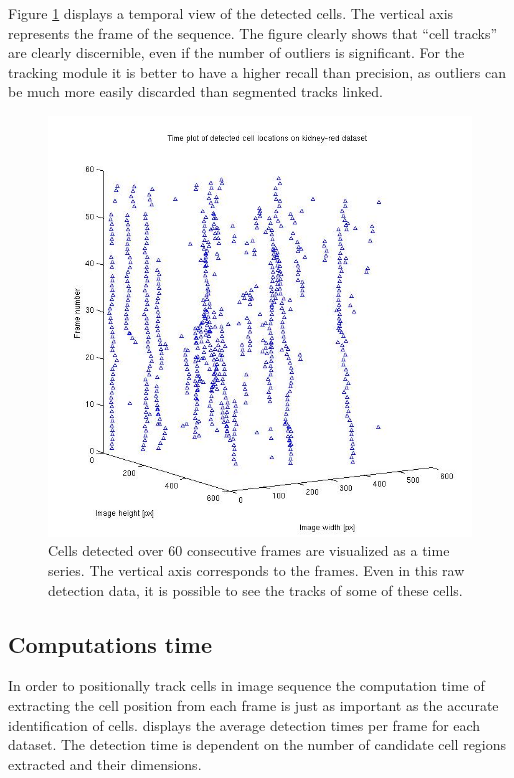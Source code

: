 		
		Figure \ref{fig:results_cell_tracks_detection} displays a temporal view of the detected cells. The vertical axis represents the frame of the sequence. The figure clearly shows that ``cell tracks'' are clearly discernible, even if the number of outliers is significant. For the tracking module it is better to have a higher recall than precision, as outliers can be much more easily discarded than segmented tracks linked.
		\begin{figure}
			\includegraphics[width=\textwidth]{images/cell_tracks}
				\caption{Cells detected over 60 consecutive frames are visualized as a time series. The vertical axis corresponds to the frames. Even in this raw detection data, it is possible to see the tracks of some of these cells.}
			\label{fig:results_cell_tracks_detection}
		\end{figure}
			
				
		
	\subsection{Computations time \statusnew}
	
		In order to positionally track cells in image sequence the computation time of extracting the cell position from each frame is just as important as the accurate identification of cells.  displays the average detection times per frame for each dataset. The detection time is dependent on the number of candidate cell regions extracted and their dimensions.
		

